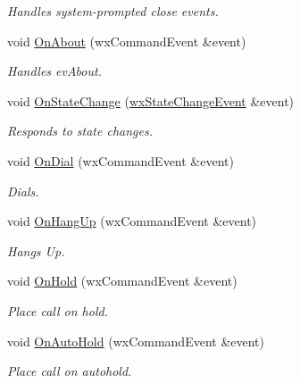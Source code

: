\begin{CompactItemize}
\begin{CompactList}\small\item\em Handles system-prompted close events. \item\end{CompactList}\item 
void \hyperlink{classMainFrame_a6cb4bffa152fb2adad782a440af5de2}{OnAbout} (wxCommandEvent \&event)
\begin{CompactList}\small\item\em Handles evAbout. \item\end{CompactList}\item 
void \hyperlink{classMainFrame_5f4f33d38822481ad0608334a798325f}{OnStateChange} (\hyperlink{classwxStateChangeEvent}{wxStateChangeEvent} \&event)
\begin{CompactList}\small\item\em Responds to state changes. \item\end{CompactList}\item 
void \hyperlink{classMainFrame_90d32f36e1682ed4f5d2c2612ce6e2e3}{OnDial} (wxCommandEvent \&event)
\begin{CompactList}\small\item\em Dials. \item\end{CompactList}\item 
void \hyperlink{classMainFrame_dbb9352129402cc4595446460c80d09f}{OnHangUp} (wxCommandEvent \&event)
\begin{CompactList}\small\item\em Hangs Up. \item\end{CompactList}\item 
void \hyperlink{classMainFrame_343bfdcd2c0c3a32a58e11136408969b}{OnHold} (wxCommandEvent \&event)
\begin{CompactList}\small\item\em Place call on hold. \item\end{CompactList}\item 
void \hyperlink{classMainFrame_bcbd80572652cfe2bc9736704149d003}{OnAutoHold} (wxCommandEvent \&event)
\begin{CompactList}\small\item\em Place call on autohold. \item\end{CompactList}\item 

\end{CompactItemize}
